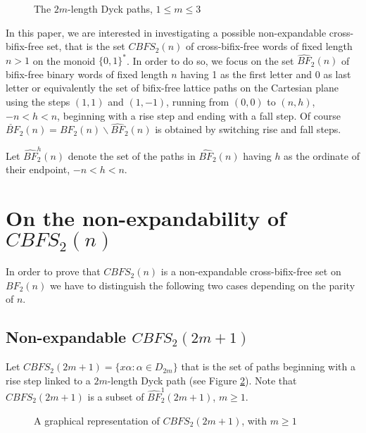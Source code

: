 \documentclass[a4paper,11pt]{article}
\begin{document}
\begin{figure}[!htb]
\begin{center}
 \caption{\small{The
$2m$-length Dyck paths, $1 \leq m \leq 3$}
\label{dick}}\vspace{-15pt}
\end{center}
\end{figure}

In this paper, we are interested in investigating a possible
non-expandable cross-bifix-free set, that is the set $CBFS_2(n)$
of cross-bifix-free words of fixed length $n>1$ on the monoid
$\{0,1\}^*$. In order to do so, we focus on the set
$\hat{BF}_2(n)$ of bifix-free binary words of fixed length $n$
having 1 as the first letter and 0 as last letter or equivalently
the set of bifix-free lattice paths on the Cartesian plane using
the steps $(1,1)$ and $(1,-1)$, running from $(0,0)$ to $(n,h)$,
$-n<h<n$, beginning with a rise step and ending with a fall step.
Of course $\check{BF}_2(n) = BF_2(n) \backslash \hat{BF}_2(n)$ is
obtained by switching rise and fall steps.

Let $\hat{BF}_{2}^{h}(n)$ denote the set of the paths in
$\hat{BF}_2(n)$ having $h$ as the ordinate of their endpoint, $-n
< h < n$.

\section{On the non-expandability of $CBFS_2(n)$}
In order to prove that $CBFS_2(n)$ is a non-expandable
cross-bifix-free set on $BF_2(n)$ we have to distinguish the
following two cases depending on the parity of $n$.

\subsection{Non-expandable $CBFS_2(2m+1)$} Let $CBFS_2(2m+1) = \{x
\alpha : \alpha \in D_{2m} \}$ that is the set of paths beginning
with a rise step linked to a $2m$-length Dyck path (see Figure
\ref{rappdis}). Note that $CBFS_2(2m+1)$ is a subset of
$\hat{BF}^1_2(2m+1)$, $m \geq 1$.
\begin{figure}[!htb]
\begin{center}
 \caption{\small{A
graphical representation of $CBFS_2(2m+1)$, with $m \geq 1$}
\label{rappdis}}\vspace{-15pt}
\end{center}
\end{figure}
\end{document}

